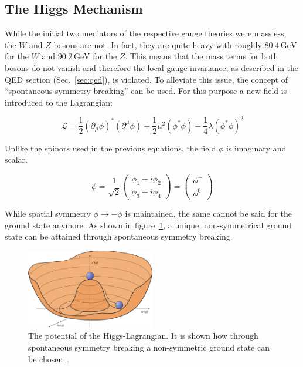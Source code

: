 \subsection{The Higgs Mechanism}
\label{sec:higgs}

While the initial two mediators of the respective gauge theories were massless, the $W$ and $Z$ bosons are not. In fact, they are quite heavy with roughly $80.4\,\text{GeV}$ for the $W$ and $90.2\,\text{GeV}$ for the $Z$. This means that the mass terms for both bosons do not vanish and therefore the local gauge invariance, as described in the QED section (Sec.~\ref{sec:qed}), is violated. To alleviate this issue, the concept of ``spontaneous symmetry breaking'' can be used. For this purpose a new field is introduced to the Lagrangian:

\begin{equation}
  \label{eq:higgslagrangian}
  \mathcal{L} =  \frac{1}{2} (\partial_\mu \phi)^* (\partial^\mu \phi)  + \frac{1}{2} \mu^2 (\phi^* \phi) - \frac{1}{4} \lambda (\phi^* \phi)^2
\end{equation}

\noindent Unlike the spinors used in the previous equations, the field $\phi$ is imaginary and scalar.

\begin{equation}
  \label{eq:higgs-field}
  \phi = \frac{1}{\sqrt{2}} 
  \begin{pmatrix}
    \phi_1 + i \phi_2 \\
    \phi_3 + i \phi_4
  \end{pmatrix}
  =
  \begin{pmatrix}
    \phi^+ \\
    \phi^0
  \end{pmatrix}
\end{equation}

\noindent While spatial symmetry $\phi \rightarrow - \phi$ is maintained, the same cannot be said for the ground state anymore. As shown in figure~\ref{fig:higgspotential}, a unique, non-symmetrical ground state can be attained through spontaneous symmetry breaking.

\begin{figure}[ht!]
  \centering
    \includegraphics[width=0.5\textwidth]{plots/higgspotential.jpg}
  \caption{The potential of the Higgs-Lagrangian. It is shown how through spontaneous symmetry breaking a non-symmetric ground state can be chosen~\cite{higgspotential}.}
  \label{fig:higgspotential}
\end{figure}

